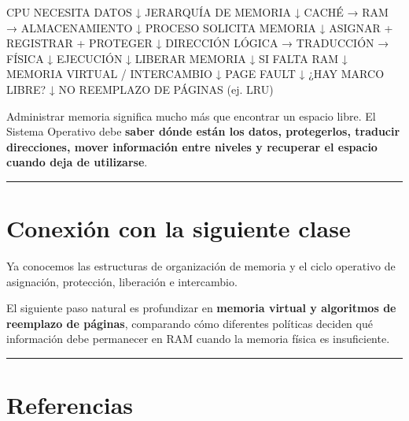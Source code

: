\documentclass[
  spanish,
  letterpaper,
]{scrbook}
\newenvironment{Shaded}{\begin{snugshade}}{\end{snugshade}}
\newcommand{\NormalTok}[1]{\textcolor[rgb]{0.00,0.23,0.31}{#1}}
\begin{document}
\begin{Shaded}
\begin{Highlighting}[]
\NormalTok{CPU NECESITA DATOS}
\NormalTok{      ↓}
\NormalTok{JERARQUÍA DE MEMORIA}
\NormalTok{      ↓}
\NormalTok{CACHÉ → RAM → ALMACENAMIENTO}
\NormalTok{      ↓}
\NormalTok{PROCESO SOLICITA MEMORIA}
\NormalTok{      ↓}
\NormalTok{ASIGNAR + REGISTRAR + PROTEGER}
\NormalTok{      ↓}
\NormalTok{DIRECCIÓN LÓGICA → TRADUCCIÓN → FÍSICA}
\NormalTok{      ↓}
\NormalTok{EJECUCIÓN}
\NormalTok{      ↓}
\NormalTok{LIBERAR MEMORIA}
\NormalTok{      ↓}
\NormalTok{SI FALTA RAM}
\NormalTok{      ↓}
\NormalTok{MEMORIA VIRTUAL / INTERCAMBIO}
\NormalTok{      ↓}
\NormalTok{PAGE FAULT}
\NormalTok{      ↓}
\NormalTok{¿HAY MARCO LIBRE?}
\NormalTok{      ↓ NO}
\NormalTok{REEMPLAZO DE PÁGINAS (ej. LRU)}
\end{Highlighting}
\end{Shaded}

Administrar memoria significa mucho más que encontrar un espacio libre.
El Sistema Operativo debe \textbf{saber dónde están los datos,
protegerlos, traducir direcciones, mover información entre niveles y
recuperar el espacio cuando deja de utilizarse}.

\begin{center}\rule{0.5\linewidth}{0.5pt}\end{center}


\chapter{Conexión con la siguiente
clase}\label{conexiuxf3n-con-la-siguiente-clase-3}

Ya conocemos las estructuras de organización de memoria y el ciclo
operativo de asignación, protección, liberación e intercambio.

El siguiente paso natural es profundizar en \textbf{memoria virtual y
algoritmos de reemplazo de páginas}, comparando cómo diferentes
políticas deciden qué información debe permanecer en RAM cuando la
memoria física es insuficiente.

\begin{center}\rule{0.5\linewidth}{0.5pt}\end{center}


\chapter{Referencias}\label{referencias-2}
\end{document}
